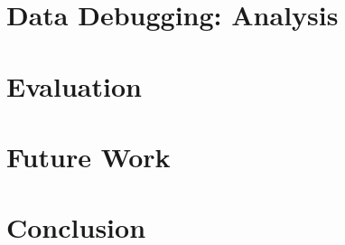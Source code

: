 \documentclass{sigplanconf}
\begin{document}
%

\section{Data Debugging: Analysis}
\label{sec:analysis}


\section{Evaluation}
\label{sec:evaluation}


\section{Future Work}
\label{sec:future}


\section{Conclusion}
\label{sec:conclusion}





% 

{


}
\end{document}
